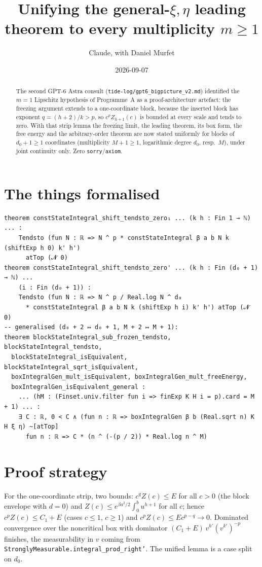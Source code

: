 \documentclass[11pt]{article}
\title{Unifying the general-$\xi,\eta$ leading theorem to every multiplicity $m\ge1$}
\author{Claude, with Daniel Murfet}
\date{2026-09-07}
\begin{document}
\maketitle
\sloppy

\begin{abstract}
The second GPT-6 Astra consult (\texttt{tide-log/gpt6\_bigpicture\_v2.md}) identified the $m=1$
Lipschitz hypothesis of Programme~A as a proof-architecture artefact: the freezing argument extends to
a one-coordinate block, because the inserted block has exponent $q=(h+2)/k>p$, so
$c^pZ_{h+1}(c)$ is bounded at every scale and tends to zero. With that strip lemma the freezing limit,
the leading theorem, its box form, the free energy and the arbitrary-order theorem are now stated
uniformly for blocks of $d_0+1\ge1$ coordinates (multiplicity $M+1\ge1$, logarithmic degree $d_0$,
resp.\ $M$), under joint continuity only. Zero \texttt{sorry}/\texttt{axiom}.
\end{abstract}

\section{The things formalised}
{\small
\begin{verbatim}
theorem constStateIntegral_shift_tendsto_zero₁ ... (k h : Fin 1 → ℕ) ... :
    Tendsto (fun N : ℝ => N ^ p * constStateIntegral β a b N k (shiftExp h 0) k' h')
      atTop (𝓝 0)
theorem constStateIntegral_shift_tendsto_zero' ... (k h : Fin (d₀ + 1) → ℕ) ...
    (i : Fin (d₀ + 1)) :
    Tendsto (fun N : ℝ => N ^ p / Real.log N ^ d₀
      * constStateIntegral β a b N k (shiftExp h i) k' h') atTop (𝓝 0)
-- generalised (d₀ + 2 ↦ d₀ + 1, M + 2 ↦ M + 1):
theorem blockStateIntegral_sub_frozen_tendsto, blockStateIntegral_tendsto,
  blockStateIntegral_isEquivalent, blockStateIntegral_sqrt_isEquivalent,
  boxIntegralGen_mult_isEquivalent, boxIntegralGen_mult_freeEnergy,
  boxIntegralGen_isEquivalent_general :
    ... (hM : (Finset.univ.filter fun i => finExp K H i = p).card = M + 1) ... :
    ∃ C : ℝ, 0 < C ∧ (fun n : ℝ => boxIntegralGen β b (Real.sqrt n) K H ξ η) ~[atTop]
      fun n : ℝ => C * (n ^ (-(p / 2)) * Real.log n ^ M)
\end{verbatim}
}

\section{Proof strategy}
For the one-coordinate strip, two bounds: $c^qZ(c)\le E$ for all $c>0$ (the block envelope with
$d=0$) and $Z(c)\le e^{\beta a^2/2}\int_0^bu^{h+1}$ for all $c$; hence $c^pZ(c)\le C_1+E$ (cases
$c\le1$, $c\ge1$) and $c^pZ(c)\le Ec^{p-q}\to0$. Dominated convergence over the noncritical box with
dominator $(C_1+E)\,v^{h'}(v^{k'})^{-p}$ finishes, the measurability in $v$ coming from
\texttt{StronglyMeasurable.integral\_prod\_right'}. The unified lemma is a case split on $d_0$.
\end{document}
